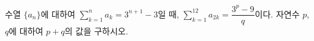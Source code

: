 수열 $\{a_n\}$에 대하여 $\displaystyle\sum_{k=1}^{n} a_k=3^{n+1}-3$일 때, $\displaystyle\sum_{k=1}^{12} a_{2k}=\dfrac{3^p-9}{q}$이다. 자연수 $p$, $q$에 대하여 $p+q$의 값을 구하시오. 
